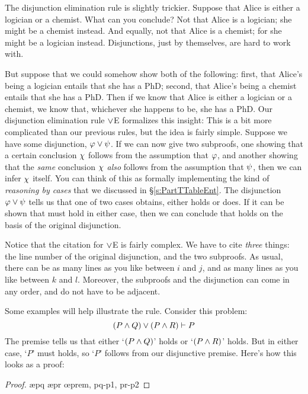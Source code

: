 The disjunction elimination rule is slightly trickier. Suppose that Alice is either a logician or a chemist. What can you conclude? Not that Alice is a logician; she might be a chemist instead. And equally, not that Alice is a chemist; for she might be a logician instead. Disjunctions, just by themselves, are hard to work with.

But suppose that we could somehow show both of the following: first, that Alice's being a logician entails that she has a PhD; second, that Alice's being a chemist entails that she has a PhD. Then if we know that Alice is either a logician or a chemist, we know that, whichever she happens to be, she has a PhD. Our disjunction elimination rule $\vee$E formalizes this insight:
This is a bit more complicated than our previous rules, but the idea is fairly simple. Suppose we have some disjunction, $\mathcal{\varphi} \vee \mathcal{\psi}$. If we can now give two subproofs, one showing that a certain conclusion $\mathcal{\chi}$ follows from the assumption that $\mathcal{\varphi}$, and another showing that the \emph{same} conclusion $\mathcal{\chi}$ \emph{also} follows from the assumption that $\mathcal{\psi}$, then we can infer $\mathcal{\chi}$ itself. You can think of this as formally implementing the kind of \emph{reasoning by cases} that we discussed in \S\ref{s:PartTTableEnt}.  The disjunction $\mathcal{\varphi} \vee \mathcal{\psi}$ tells us that one of two cases obtains, either \meta{\varphi} holds or \meta{\psi} does.  If it can be shown that \meta{\chi} must hold in either case, then we can conclude that \meta{\chi} holds on the basis of the original disjunction.

Notice that the citation for $\vee$E is fairly complex.  We have to cite \emph{three} things: the line number of the original disjunction, and the two subproofs.  As usual, there can be as many lines as you like between $i$ and $j$, and as many lines as you like between $k$ and $l$. Moreover, the subproofs and the disjunction can come in any order, and do not have to be adjacent.

Some examples will help illustrate the rule. Consider this problem:
$$(P \wedge Q) \vee (P \wedge R) \vdash P$$
The premise tells us that either `$(P \wedge Q)$' holds or `$(P \wedge R)$' holds.  But in either case, `$P$' must holds, so `$P$' follows from our disjunctive premise.  Here's how this looks as a proof:
	\begin{proof}
			\open
				 
				\ae{pq}
			\close
			\open
				 
				\ae{pr}
			\close
		\oe{prem, pq-p1, pr-p2}
	\end{proof}

